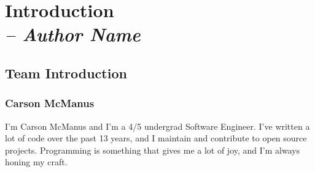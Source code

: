 \chapter{Introduction \\
  \small{\textit{-- Author Name}}
  \label{Chapter::Introduction}}

\section{Team Introduction \label{Section::TeamIntroduction}}

\subsection{Carson McManus}

I'm Carson McManus and I'm a 4/5 undergrad Software Engineer. I've written a lot of code over the past 13 years, and I maintain and contribute to open source projects. Programming is something that gives me a lot of joy, and I'm always honing my craft.

